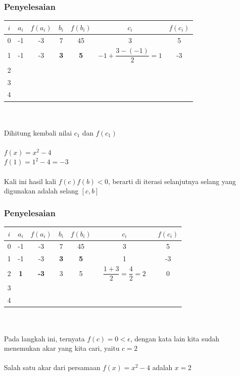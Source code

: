 \documentclass{beamer}
\begin{document}

\begin{frame}
\frametitle{Penyelesaian}
\begin{tabular}{|c|c|c|c|c|c|c|}
\hline
	$i$ & $a_i$ & $f(a_i)$ & $b_i$ & $f(b_i)$ & $c_i$ & $f(c_i)$\\
\hline
	0 & -1 & -3 & 7 & 45 & $\qquad\quad\ $ 3 $\qquad\quad\ $  & 5\\
\hline
	1 & -1 & -3 & \textbf{3} & \textbf{5} &  $-1+\dfrac{3-(-1)}{2}=1$ & -3\\
\hline
	2 &  &  &  &  &  & \\
\hline
	3 &  &  &  &  &  & \\
\hline
	4 &  &  &  &  &  & \\
\hline
\end{tabular}
\\\ \\Dihitung kembali nilai $c_1$ dan $f(c_1)$
\\\ \\$f(x) = x^2 - 4$
\\$f(1) = 1^2 - 4 = -3$
\\\ \\Kali ini hasil kali $f(c)f(b)<0$, berarti di iterasi selanjutnya selang yang digunakan adalah selang $[c,b]$
\end{frame}

\begin{frame}
\frametitle{Penyelesaian}
\begin{tabular}{|c|c|c|c|c|c|c|}
\hline
	$i$ & $a_i$ & $f(a_i)$ & $b_i$ & $f(b_i)$ & $c_i$ & $f(c_i)$\\
\hline
	0 & -1 & -3 & 7 & 45 & $\qquad\quad\ $ 3 $\qquad\quad\ $  & 5\\
\hline
	1 & -1 & -3 & \textbf{3} & \textbf{5} &  1 & -3\\
\hline
	2 & \textbf{1} & \textbf{-3} & 3 & 5 &  $\dfrac{1+3}{2}=\dfrac{4}{2}=2$ & 0\\
\hline
	3 &  &  &  &  &  & \\
\hline
	4 &  &  &  &  &  & \\
\hline
\end{tabular}
\\\ \\Pada langkah ini, ternyata $f(c) = 0 < \epsilon$, dengan kata lain kita sudah menemukan akar yang kita cari, yaitu $c = 2$ 
\\\ \\Salah satu akar dari persamaan $f(x) = x^2-4$ adalah $x=2$

\end{frame}
\end{document}
